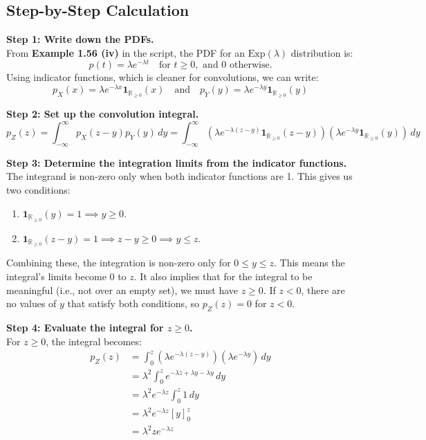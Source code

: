 \documentclass[11pt,a4paper]{article}
\newcommand{\indicator}[1]{\mathbf{1}_{#1}}
\begin{document}
\subsection{Step-by-Step Calculation}
\noindent\textbf{Step 1: Write down the PDFs.} \\
From \textbf{Example 1.56 (iv)} in the script, the PDF for an $\text{Exp}(\lambda)$ distribution is:
\[
p(t) = \lambda e^{-\lambda t} \quad \text{for } t \ge 0, \text{ and } 0 \text{ otherwise.}
\]
Using indicator functions, which is cleaner for convolutions, we can write:
\[
p_X(x) = \lambda e^{-\lambda x} \indicator{\mathbb{R}_{\ge 0}}(x) \quad \text{and} \quad p_Y(y) = \lambda e^{-\lambda y} \indicator{\mathbb{R}_{\ge 0}}(y)
\]

\noindent\textbf{Step 2: Set up the convolution integral.}
\[
p_Z(z) = \int_{-\infty}^{\infty} p_X(z-y) p_Y(y) \, dy = \int_{-\infty}^{\infty} \left( \lambda e^{-\lambda(z-y)} \indicator{\mathbb{R}_{\ge 0}}(z-y) \right) \left( \lambda e^{-\lambda y} \indicator{\mathbb{R}_{\ge 0}}(y) \right) \, dy
\]

\noindent\textbf{Step 3: Determine the integration limits from the indicator functions.} \\
The integrand is non-zero only when both indicator functions are 1. This gives us two conditions:
\begin{enumerate}
    \item $\indicator{\mathbb{R}_{\ge 0}}(y) = 1 \implies y \ge 0$.
    \item $\indicator{\mathbb{R}_{\ge 0}}(z-y) = 1 \implies z-y \ge 0 \implies y \le z$.
\end{enumerate}
Combining these, the integration is non-zero only for $0 \le y \le z$. This means the integral's limits become $0$ to $z$. It also implies that for the integral to be meaningful (i.e., not over an empty set), we must have $z \ge 0$. If $z < 0$, there are no values of $y$ that satisfy both conditions, so $p_Z(z) = 0$ for $z < 0$.

\noindent\textbf{Step 4: Evaluate the integral for $z \ge 0$.}\\
For $z \ge 0$, the integral becomes:
\begin{align*}
p_Z(z) &= \int_{0}^{z} (\lambda e^{-\lambda(z-y)}) (\lambda e^{-\lambda y}) \, dy \\
&= \lambda^2 \int_{0}^{z} e^{-\lambda z + \lambda y - \lambda y} \, dy \\
&= \lambda^2 e^{-\lambda z} \int_{0}^{z} 1 \, dy \\
&= \lambda^2 e^{-\lambda z} [y]_0^z \\
&= \lambda^2 z e^{-\lambda z}
\end{align*}
\end{document}
